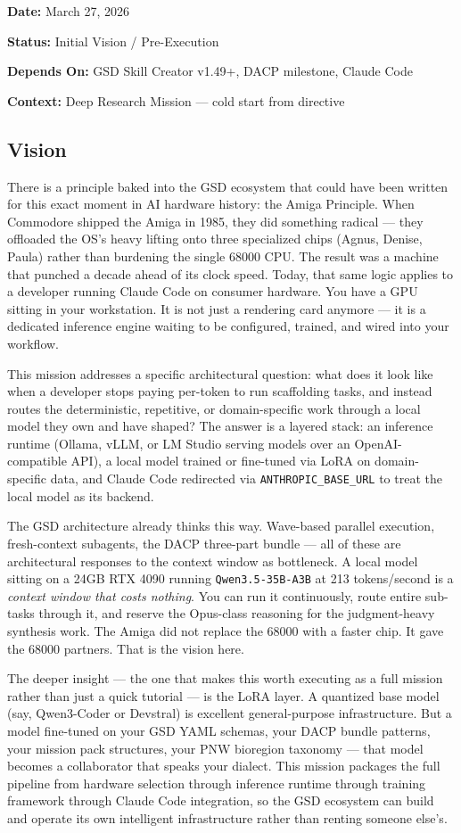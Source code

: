 \documentclass[11pt,letterpaper]{article}
\newcommand{\metafield}[2]{\textbf{\sffamily #1} #2\par}
\begin{document}
\metafield{Date:}{March 27, 2026}
\metafield{Status:}{Initial Vision / Pre-Execution}
\metafield{Depends On:}{GSD Skill Creator v1.49+, DACP milestone, Claude Code}
\metafield{Context:}{Deep Research Mission --- cold start from directive}

\subsection{Vision}

There is a principle baked into the GSD ecosystem that could have been written for this exact moment in AI hardware history: the Amiga Principle. When Commodore shipped the Amiga in 1985, they did something radical --- they offloaded the OS's heavy lifting onto three specialized chips (Agnus, Denise, Paula) rather than burdening the single 68000 CPU. The result was a machine that punched a decade ahead of its clock speed. Today, that same logic applies to a developer running Claude Code on consumer hardware. You have a GPU sitting in your workstation. It is not just a rendering card anymore --- it is a dedicated inference engine waiting to be configured, trained, and wired into your workflow.

This mission addresses a specific architectural question: what does it look like when a developer stops paying per-token to run scaffolding tasks, and instead routes the deterministic, repetitive, or domain-specific work through a local model they own and have shaped? The answer is a layered stack: an inference runtime (Ollama, vLLM, or LM Studio serving models over an OpenAI-compatible API), a local model trained or fine-tuned via LoRA on domain-specific data, and Claude Code redirected via \texttt{ANTHROPIC\_BASE\_URL} to treat the local model as its backend.

The GSD architecture already thinks this way. Wave-based parallel execution, fresh-context subagents, the DACP three-part bundle --- all of these are architectural responses to the context window as bottleneck. A local model sitting on a 24GB RTX 4090 running \texttt{Qwen3.5-35B-A3B} at 213 tokens/second is a \emph{context window that costs nothing}. You can run it continuously, route entire sub-tasks through it, and reserve the Opus-class reasoning for the judgment-heavy synthesis work. The Amiga did not replace the 68000 with a faster chip. It gave the 68000 partners. That is the vision here.

The deeper insight --- the one that makes this worth executing as a full mission rather than just a quick tutorial --- is the LoRA layer. A quantized base model (say, Qwen3-Coder or Devstral) is excellent general-purpose infrastructure. But a model fine-tuned on your GSD YAML schemas, your DACP bundle patterns, your mission pack structures, your PNW bioregion taxonomy --- that model becomes a collaborator that speaks your dialect. This mission packages the full pipeline from hardware selection through inference runtime through training framework through Claude Code integration, so the GSD ecosystem can build and operate its own intelligent infrastructure rather than renting someone else's.
\end{document}
